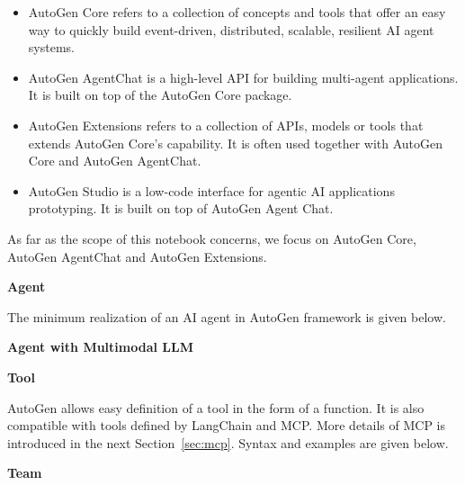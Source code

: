 \begin{itemize}
	\item {}
	
	AutoGen Core refers to a collection of concepts and tools that offer an easy way to quickly build event-driven, distributed, scalable, resilient AI agent systems.
	
	\item {} 
	
	AutoGen AgentChat is a high-level API for building multi-agent applications. It is built on top of the AutoGen Core package.
	
	\item {}
	
	AutoGen Extensions refers to a collection of APIs, models or tools that extends AutoGen Core's capability. It is often used together with AutoGen Core and AutoGen AgentChat.
	
	\item {}
	
	AutoGen Studio is a low-code interface for agentic AI applications prototyping. It is built on top of AutoGen Agent Chat.
	
\end{itemize}

As far as the scope of this notebook concerns, we focus on AutoGen Core, AutoGen AgentChat and AutoGen Extensions.

\vspace{0.1in}
\noindent \textbf{Agent}
\vspace{0.1in}

The minimum realization of an AI agent in AutoGen framework is given below.


\vspace{0.1in}
\noindent \textbf{Agent with Multimodal LLM}
\vspace{0.1in}




\vspace{0.1in}
\noindent \textbf{Tool}
\vspace{0.1in}

AutoGen allows easy definition of a tool in the form of a function. It is also compatible with tools defined by LangChain and MCP. More details of MCP is introduced in the next Section~\ref{sec:mcp}. Syntax and examples are given below.

\vspace{0.1in}
\noindent \textbf{Team}
\vspace{0.1in}

